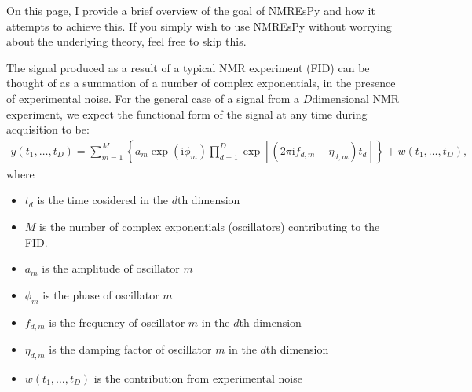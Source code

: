 \documentclass[letterpaper,10pt,english]{sphinxmanual}
\begin{document}
\sphinxAtStartPar
On this page, I provide a brief overview of the goal of NMR\sphinxhyphen{}EsPy and how
it attempts to achieve this. If you simply wish to use NMR\sphinxhyphen{}EsPy without
worrying about the underlying theory, feel free to skip this.

\sphinxAtStartPar
The signal produced as a result of a typical NMR experiment (FID) can be
thought of as a summation of a number of complex exponentials, in
the presence of experimental noise. For the general case of a signal from a
\(D\)\sphinxhyphen{}dimensional NMR experiment, we expect the functional form of the
signal at any time during acquisition to be:
\begin{equation*}
\begin{split}y(t_1, \dots, t_D) = \sum_{m=1}^{M}
\left\lbrace a_m \exp\left(\mathrm{i} \phi_m\right)
\prod_{d=1}^{D} \exp\left[\left(2 \pi \mathrm{i} f_{d,m} -
\eta_{d,m}\right)t_d\right]\right\rbrace + w(t_1, \dots, t_D),\end{split}
\end{equation*}
\sphinxAtStartPar
where
\begin{itemize}
\item {} 
\sphinxAtStartPar
\(t_d\) is the time cosidered in the \(d\)\sphinxhyphen{}th dimension

\item {} 
\sphinxAtStartPar
\(M\) is the number of complex exponentials (oscillators) contributing to the FID.

\item {} 
\sphinxAtStartPar
\(a_m\) is the amplitude of oscillator \(m\)

\item {} 
\sphinxAtStartPar
\(\phi_m\) is the phase of oscillator \(m\)

\item {} 
\sphinxAtStartPar
\(f_{d,m}\) is the frequency of oscillator \(m\) in the
\(d\)\sphinxhyphen{}th dimension

\item {} 
\sphinxAtStartPar
\(\eta_{d,m}\) is the damping factor of oscillator \(m\) in the
\(d\)\sphinxhyphen{}th dimension

\item {} 
\sphinxAtStartPar
\(w(t_1, \dots, t_D)\) is the contribution from experimental noise

\end{itemize}
\end{document}
